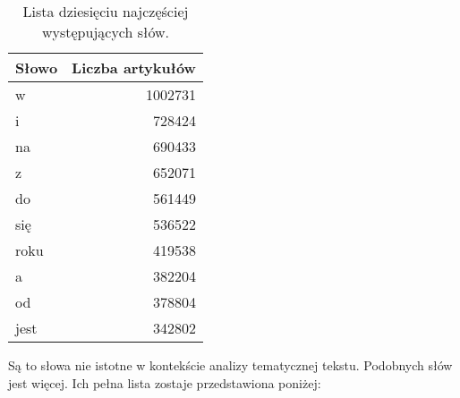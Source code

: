 \documentclass[12pt, twoside, openany]{report}\usepackage[]{graphicx}\usepackage[]{color}
\newenvironment{knitrout}{}{} %
\theoremstyle{plain}
\begin{document}
\begin{knitrout}
\color{fgcolor}\begin{table}

\caption{Lista dziesięciu najczęściej występujących słów.}
\begin{tabular}{l|r}
\hline
Słowo & Liczba artykułów\\
\hline
w & 1002731\\
\hline
i & 728424\\
\hline
na & 690433\\
\hline
z & 652071\\
\hline
do & 561449\\
\hline
się & 536522\\
\hline
roku & 419538\\
\hline
a & 382204\\
\hline
od & 378804\\
\hline
jest & 342802\\
\hline
\end{tabular}
\end{table}


\end{knitrout}

Są to słowa nie istotne w kontekście analizy tematycznej tekstu. Podobnych słów jest więcej. Ich pełna lista zostaje przedstawiona poniżej:
\end{document}
